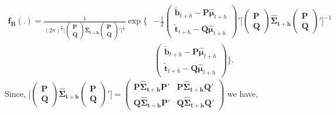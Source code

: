 \documentclass[a4paper, 11pt]{article}
\begin{document}
	\begin{align*}
	\bm{f_B}(.)=\frac{1}{(2\pi)^{\frac{n}{2}}\Big|\begin{pmatrix}\bm{P}\\\bm{Q}\end{pmatrix}\bm{\hat{\Sigma}_{t+h}}\begin{pmatrix}\bm{P}\\\bm{Q}\end{pmatrix}'\Big|^{\frac{1}{2}}}
	\exp \Big\{&-\frac{1}{2} \begin{pmatrix}\tilde{\bm{b}}_{t+h} - \bm{P}\bm{\hat{\mu}}_{t+h}\\ \tilde{\bm{t}}_{t+h}- \bm{Q}\bm{\hat{\mu}}_{t+h}\end{pmatrix}' \Big[\begin{pmatrix}\bm{P}\\\bm{Q}\end{pmatrix}\bm{\hat{\Sigma}_{t+h}}\begin{pmatrix}\bm{P}\\\bm{Q}\end{pmatrix}'\Big]^{-1}\\
	& \begin{pmatrix}\tilde{\bm{b}}_{t+h} - \bm{P}\bm{\hat{\mu}}_{t+h}\\ \tilde{\bm{t}}_{t+h}- \bm{Q}\bm{\hat{\mu}}_{t+h}\end{pmatrix} \Big\}.
	\end{align*}
	Since, $\Big[\begin{pmatrix}\bm{P}\\\bm{Q}\end{pmatrix}\bm{\hat{\Sigma}_{t+h}}\begin{pmatrix}\bm{P}\\\bm{Q}\end{pmatrix}'\Big] = \begin{pmatrix}
	\bm{P}\bm{\hat{\Sigma}_{t+h}}\bm{P}' & \bm{P}\bm{\hat{\Sigma}_{t+h}}\bm{Q}' \\
	\bm{Q}\bm{\hat{\Sigma}_{t+h}}\bm{P}' & \bm{Q}\bm{\hat{\Sigma}_{t+h}}\bm{Q}'
	\end{pmatrix}$ we have,
\end{document}
